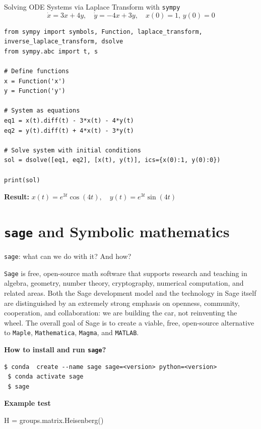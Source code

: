 \documentclass[10pt]{beamer}
\newcommand{\gd}[2]{\begin{debox}[label=#1]#2\end{debox}}
\begin{document}
\begin{frame}[fragile]{Solving ODE Systems via Laplace Transform with \texttt{sympy}}
\vspace{-0.3cm}
\[
\dot{x} = 3x + 4y,\quad \dot{y} = -4x + 3y,\quad x(0) = 1,\, y(0) = 0
\]
\begin{lstlisting}[style=mypython]
from sympy import symbols, Function, laplace_transform, inverse_laplace_transform, dsolve
from sympy.abc import t, s

# Define functions
x = Function('x')
y = Function('y')

# System as equations
eq1 = x(t).diff(t) - 3*x(t) - 4*y(t)
eq2 = y(t).diff(t) + 4*x(t) - 3*y(t)

# Solve system with initial conditions
sol = dsolve([eq1, eq2], [x(t), y(t)], ics={x(0):1, y(0):0})

print(sol)
\end{lstlisting}

\textbf{Result:} $x(t) = e^{3t}\cos(4t),\quad y(t) = e^{3t}\sin(4t)$  
\end{frame}

\section{\textbf{\texttt{sage} and Symbolic mathematics}}
\begin{frame}[fragile]{\texttt{sage}: what can we do with it? And how?}
\gd{impliciteintersection}{\texttt{Sage} is free, open-source math software that supports research and teaching in algebra, geometry, number theory, cryptography, numerical computation, and related areas. Both the Sage development model and the technology in Sage itself are distinguished by an extremely strong emphasis on openness, community, cooperation, and collaboration: we are building the car, not reinventing the wheel. The overall goal of Sage is to create a viable, free, open-source alternative to \texttt{Maple}, \texttt{Mathematica}, \texttt{Magma}, and \texttt{MATLAB}.}

\begin{block}{\textbf{How to install  and run \texttt{sage}?}}
	\begin{lstlisting}[style=advancedshell]
 $ conda  create --name sage sage=<version> python=<version>
 $ conda activate sage 
 $ sage
	\end{lstlisting}
\end{block}
\vspace{-0.1cm}
\begin{block}{\textbf{Example test}}
\begin{sageblock}
H = groups.matrix.Heisenberg()
\end{sageblock}

\end{block}
\end{frame}
\end{document}
